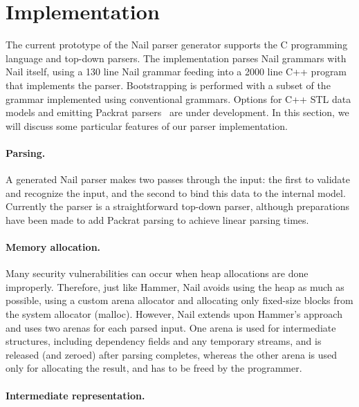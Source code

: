 \section{Implementation}
\label{s:impl}

The current prototype of the Nail parser generator supports the C programming
language and top-down parsers. The implementation parses Nail grammars with Nail itself, using a 130
line Nail grammar feeding into a 2000 line C++ program that implements the parser. Bootstrapping is
performed with a subset of the grammar implemented using conventional grammars. 
Options for C++ STL data models and emitting
Packrat parsers~\cite{packrat-parsing:icfp02} are under development. In
this section, we will discuss some particular features of our parser
implementation.



\paragraph{Parsing.}

A generated Nail parser makes two passes through the input: the first to
validate and recognize the input, and the second to bind this data to the internal
model. Currently the parser is a straightforward top-down parser, although
preparations have been made to add Packrat parsing to achieve linear parsing
times.

\paragraph{Memory allocation.}

Many security vulnerabilities can occur when heap allocations are done improperly. Therefore, just
like Hammer, Nail avoids using the heap as much as possible, using a custom arena allocator and
allocating only fixed-size blocks from the system allocator (malloc). However, Nail extends upon
Hammer's approach and uses two arenas for each parsed input. One arena is used for intermediate
structures, including dependency fields and any temporary streams, and is released (and zeroed)
after parsing completes, whereas the other arena is used only for allocating the result, and has to
be freed by the programmer.

\paragraph{Intermediate representation.}

